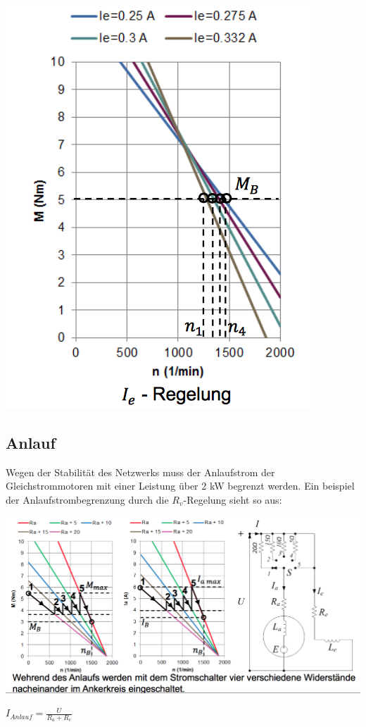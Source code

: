 \begin{minipage}{0.3 \linewidth}
\includegraphics[width = \linewidth]{./Pics/VL45/Drehzahlregelung3}
\end{minipage}

\subsection{Anlauf}
Wegen der Stabilität des Netzwerks muss der Anlaufstrom der Gleichstrommotoren mit einer Leistung über 2 kW begrenzt werden. Ein beispiel der Anlaufstrombegrenzung durch die $R_v$-Regelung sieht so aus: \\
\begin{minipage}{0.75 \linewidth}
\includegraphics[width = \linewidth]{./Pics/VL45/Anlauf}
\end{minipage}
\begin{minipage}{0.25 \linewidth}
$I_{Anlauf} = \frac{U}{R_a + R_v}$
\end{minipage}

